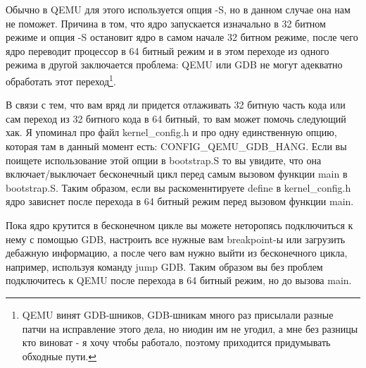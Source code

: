 Обычно в QEMU для этого используется опция -S, но в данном случае она нам не
поможет. Причина в том, что ядро запускается изначально в 32 битном режиме и
опция -S остановит ядро в самом начале 32 битном режиме, после чего ядро
переводит процессор в 64 битный режим и в этом переходе из одного режима в
другой заключается проблема: QEMU или GDB не могут адекватно обработать этот
переход\footnote{QEMU винят GDB-шников, GDB-шникам много раз присылали разные
патчи на исправление этого дела, но ниодин им не угодил, а мне без разницы кто
виноват - я хочу чтобы работало, поэтому приходится придумывать обходные пути.}.

В связи с тем, что вам вряд ли придется отлаживать 32 битную часть кода или сам
переход из 32 битного кода в 64 битный, то вам может помочь следующий хак. Я
упоминал про файл kernel\_config.h и про одну единственную опцию, которая там
в данный момент есть: CONFIG\_QEMU\_GDB\_HANG. Если вы поищете использование
этой опции в bootstrap.S то вы увидите, что она включает/выключает бесконечный
цикл перед самым вызовом функции main в bootstrap.S. Таким образом, если вы
раскоменнтируете define в kernel\_config.h ядро зависнет после перехода в
64 битный режим перед вызовом функции main.

Пока ядро крутится в бесконечном цикле вы можете неторопясь подключиться к нему
с помощью GDB, настроить все нужные вам breakpoint-ы или загрузить дебажную
информацию, а после чего вам нужно выйти из бесконечного цикла, например,
используя команду jump GDB. Таким образом вы без проблем подключитесь к QEMU
после перехода в 64 битный режим, но до вызова main.
